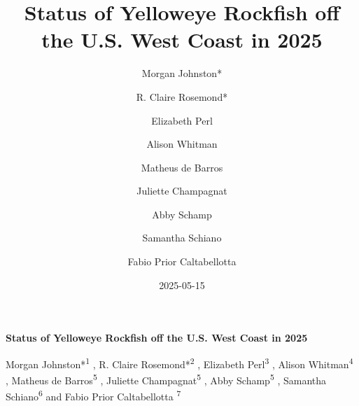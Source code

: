 \documentclass[
]{scrartcl}
\title{Status of Yelloweye Rockfish off the U.S. West Coast in 2025}
\author{Morgan Johnston* \and R. Claire Rosemond* \and Elizabeth
Perl \and Alison Whitman \and Matheus de Barros \and Juliette
Champagnat \and Abby Schamp \and Samantha Schiano \and Fabio Prior
Caltabellotta}
\date{2025-05-15}
\begin{document}
  \begin{titlepage}

  \begin{minipage}[b][\textheight][s]{\textwidth}


  \raggedright




  {\huge\bfseries\nohyphens{Status of Yelloweye Rockfish off the U.S.
  West Coast in 2025}}\\[1\baselineskip]



  \vspace{1\baselineskip}


  \vspace{1\baselineskip}

   {\large{Morgan Johnston*}}{\textsuperscript{1}}%
  ,
   {\large{R. Claire Rosemond*}}{\textsuperscript{2}}%
  ,
   {\large{Elizabeth Perl}}{\textsuperscript{3}}%
  ,
   {\large{Alison Whitman}}{\textsuperscript{4}}%
  ,
   {\large{Matheus de Barros}}{\textsuperscript{5}}%
  ,
   {\large{Juliette Champagnat}}{\textsuperscript{5}}%
  ,
   {\large{Abby Schamp}}{\textsuperscript{5}}%
  ,
   {\large{Samantha Schiano}}{\textsuperscript{6}}%
  { and \large{Fabio Prior Caltabellotta}}%
  {\textsuperscript{7}}%



\end{minipage}
\end{titlepage}
\end{document}
